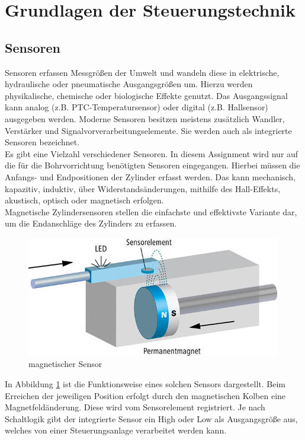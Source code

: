\section{Grundlagen der Steuerungstechnik}
\subsection{Sensoren}
Sensoren erfassen Messgrößen der Umwelt und wandeln diese in elektrische, hydraulische oder pneumatische Ausgangsgrößen um. Hierzu werden physikalische, chemische oder biologische Effekte genutzt. Das Ausgangssignal kann analog (z.B. PTC-Temperatursensor) oder digital (z.B. Hallsensor) ausgegeben werden. Moderne Sensoren besitzen meistens zusätzlich Wandler, Verstärker und Signalvorverarbeitungselemente. Sie werden auch als integrierte Sensoren bezeichnet. \autocite[vgl.][389 \psqq]{Hering2021} \\
Es gibt eine Vielzahl verschiedener Sensoren. In diesem Assign\-ment wird nur auf die für die Bohrvorrichtung benötigten Sensoren eingegangen. Hierbei müssen die Anfangs- und Endpositionen der Zylinder erfasst werden. Das kann mechanisch, kapazitiv, induktiv, über Widerstandsänderungen, mithilfe des Hall-Effekts, akustisch, optisch oder magnetisch erfolgen. \autocite[vgl.][394\psqq]{Hering2021} \\
Magnetische Zylindersensoren stellen die einfachste und effektivste Variante dar, um die Endanschläge des Zylinders zu erfassen.
\begin{figure}[H]
   \centering
    \includegraphics[scale=0.7]{Bilder/magnetischer_Zylinderschalter.jpg}
    \caption[magnetischer Sensor]{magnetischer Sensor
    \footnotemark}
    \label{fig:magSensor}
\end{figure}
In Abbildung \ref{fig:magSensor} ist die Funktionsweise eines solchen Sensors dargestellt. Beim Erreichen der jeweiligen Position erfolgt durch den magnetischen Kolben eine Magnetfeldänderung. Diese wird vom Sensorelement registriert. Je nach Schaltlogik gibt der integrierte Sensor ein High oder Low als Ausgangsgröße aus, welches von einer Steuerungsanlage verarbeitet werden kann. \autocite[vgl.][]{Magnetsensor}
